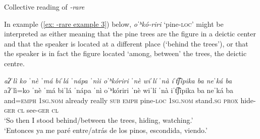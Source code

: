 \ea\label{ex:  two examples of -rare}
{Collective reading of \textit{-rare}}
    \z
\z

In example (\ref{ex: -rare example 3}) below, \textit{oˈʰkó-riri} ‘pine-\textsc{loc}’ might be interpreted as either meaning that the pine trees are the figure in a deictic center and that the speaker is located at a different place (‘behind the trees’), or that the speaker is in fact the figure located  ‘among, between’ the trees, the deictic centre.

\ea\label{ex: -rare example 3}

    \textit{aʔˈlì   ko   ˈnè ˈmá   biˈlá    ˈnápa ˈnìi oˈʰkóriri ˈnè     wiˈlí    ˈnà   iˈt͡ʃîpika   ba   neˈká   ba}\\
    \gll    aʔˈlì=ko   ˈnè ˈmá     biˈlá    ˈnápa ˈnì oˈʰkóriri ˈnè     wiˈlí    ˈnà   iˈt͡ʃîpika   ba   neˈká   ba\\
            and=\textsc{emph}  \textsc{1sg.nom} already  really    \textsc{sub} \textsc{emph}  pine-\textsc{loc} \textsc{1sg.nom}   stand.\textsc{sg}  \textsc{prox}  hide-\textsc{ger} \textsc{cl} see-\textsc{ger} \textsc{cl}\\
    \glt    ‘So then I stood behind/between the trees, hiding, watching.’\\
    \glt    ‘Entonces ya me paré entre/atrás de los pinos, escondida, viendo.’ \\


